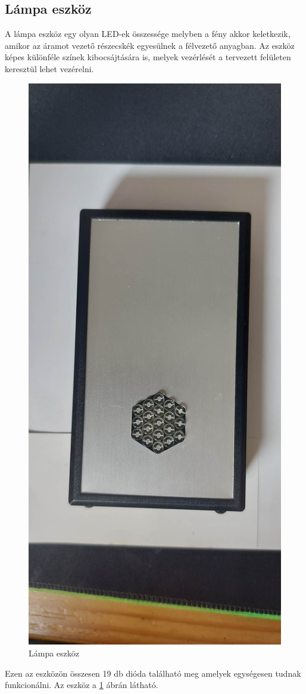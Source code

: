 \documentclass[tocnopagenum]{thesis-ekf}
\theoremstyle{definition}
\theoremstyle{remark}
\begin{document}
	\subsection{Lámpa eszköz}
	A lámpa eszköz egy olyan LED-ek összessége melyben a fény akkor keletkezik, amikor az áramot vezető részecskék egyesülnek a félvezető anyagban. Az eszköz képes különféle színek kibocsájtására is, melyek vezérlését a tervezett felületen keresztül lehet vezérelni.
	\begin{figure}[H]	
		\centering
		\includegraphics[scale=0.10]{lamp01}
		\caption[Lámpa eszköz]{Lámpa eszköz}
		\label{fig:lamp01}
	\end{figure}
	Ezen az eszközön összesen 19 db dióda található meg amelyek egységesen tudnak funkcionálni. 
	Az eszköz a \ref{fig:lamp01} ábrán látható.
\end{document}
